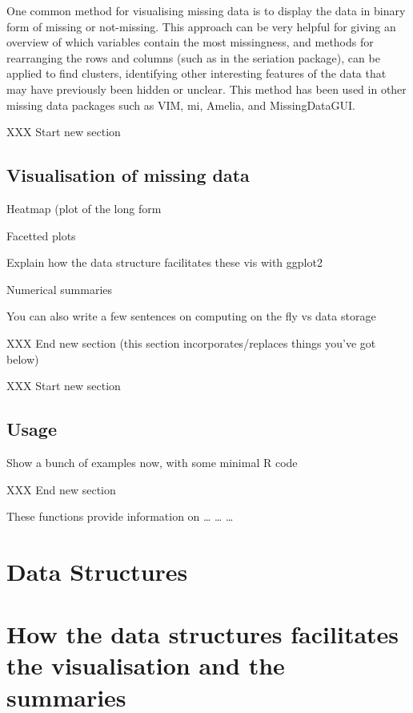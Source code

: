 \documentclass[]{article}
\begin{document}
One common method for visualising missing data is to display the data in
binary form of missing or not-missing. This approach can be very helpful
for giving an overview of which variables contain the most missingness,
and methods for rearranging the rows and columns (such as in the
seriation package), can be applied to find clusters, identifying other
interesting features of the data that may have previously been hidden or
unclear. This method has been used in other missing data packages such
as VIM, mi, Amelia, and MissingDataGUI.

XXX Start new section

\subsection{Visualisation of missing
data}\label{visualisation-of-missing-data}

Heatmap (plot of the long form

Facetted plots

Explain how the data structure facilitates these vis with ggplot2

Numerical summaries

You can also write a few sentences on computing on the fly vs data
storage

XXX End new section (this section incorporates/replaces things you've
got below)

XXX Start new section

\subsection{Usage}\label{usage}

Show a bunch of examples now, with some minimal R code

XXX End new section

These functions provide information on \ldots{} \ldots{} \ldots{}

\section{Data Structures}\label{data-structures}

\section{How the data structures facilitates the visualisation and the
summaries}\label{how-the-data-structures-facilitates-the-visualisation-and-the-summaries}
\end{document}
